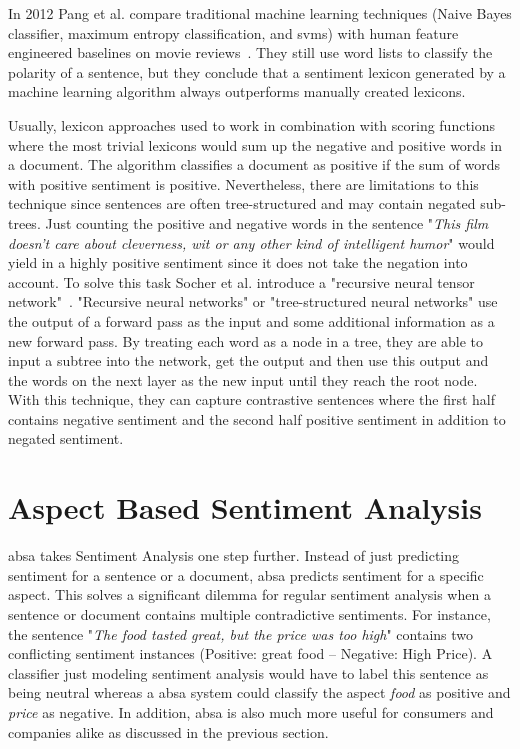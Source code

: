 In 2012 Pang et al. compare traditional machine learning techniques {(Naive Bayes classifier, maximum entropy classification, and \glspl{svm})} with human feature engineered baselines on movie reviews~\cite{Pang2012}. They still use word lists to classify the polarity of a sentence, but they conclude that a sentiment lexicon generated by a machine learning algorithm always outperforms manually created lexicons.
\medskip


Usually, lexicon approaches used to work in combination with scoring functions where the most trivial lexicons would sum up the negative and positive words in a document. The algorithm classifies a document as positive if the sum of words with positive sentiment is positive. Nevertheless, there are limitations to this technique since sentences are often tree-structured and may contain negated sub-trees. Just counting the positive and negative words in the sentence "\textit{This film doesn't care about cleverness, wit or any other kind of intelligent humor}"\cite{Socher2013} would yield in a highly positive sentiment since it does not take the negation into account. To solve this task Socher et al. introduce a "recursive neural tensor network"~\cite{Socher2013}. "Recursive neural networks" or "tree-structured neural networks" use the output of a forward pass as the input and some additional information as a new forward pass. By treating each word as a node in a tree, they are able to input a subtree into the network, get the output and then use this output and the words on the next layer as the new input until they reach the root node. With this technique, they can capture contrastive sentences where the first half contains negative sentiment and the second half positive sentiment in addition to negated sentiment. 
\medskip

\section{Aspect Based Sentiment Analysis}
\label{sec:02_absa}

\acrfull{absa} takes Sentiment Analysis one step further. Instead of just predicting sentiment for a sentence or a document, \gls{absa} predicts sentiment for a specific aspect. This solves a significant dilemma for regular sentiment analysis when a sentence or document contains multiple contradictive sentiments. For instance, the sentence "\textit{The food tasted great, but the price was too high}" contains two conflicting sentiment instances {(Positive: great food -- Negative: High Price)}. A classifier just modeling sentiment analysis would have to label this sentence as being neutral whereas a \gls{absa} system could classify the aspect \textit{food} as positive and \textit{price} as negative. In addition, \gls{absa} is also much more useful for consumers and companies alike as discussed in the previous section.
\medskip

